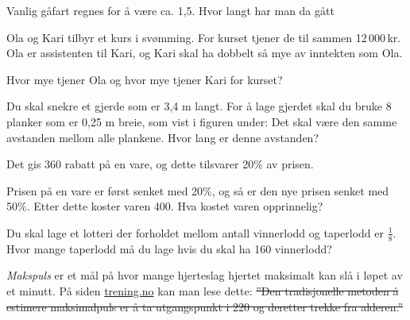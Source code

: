 



\opgt
\nes
{}
Vanlig gåfart regnes for å være ca. 1,5. Hvor langt har man da gått

Ola og Kari tilbyr et kurs i svømming. For kurset tjener de til sammen 12\,000\,kr. Ola er assistenten til Kari, og Kari skal ha dobbelt så mye av inntekten som Ola. \os

Hvor mye tjener Ola og hvor mye tjener Kari for kurset?

Du skal snekre et gjerde som er 3,4 m langt. For å lage gjerdet skal du bruke 8 planker som er 0,25 m breie, som vist i figuren under:
Det skal være den samme avstanden mellom alle plankene. Hvor lang er denne avstanden?

 \vs
{}

 \vs
{}

Det gis 360 rabatt på en vare, og dette tilsvarer 20\% av prisen.

Prisen på en vare er først senket med 20\%, og så er den nye prisen senket med 50\%. Etter dette koster varen 400. Hva kostet varen opprinnelig?

Du skal lage et lotteri der forholdet mellom antall vinnerlodd og taperlodd er $ \frac{1}{8} $. Hvor mange taperlodd må du lage hvis du skal ha 160 vinnerlodd?

\textit{Makspuls} er et mål på hvor mange hjerteslag hjertet maksimalt kan slå i løpet av et minutt. På siden \href{http://www.trening.no/utholdenhet/ny-formel-for-beregning-av-makspuls/}{\color{blue}trening.no} kan man lese dette:\os
\st{''Den tradisjonelle metoden å estimere maksimalpuls er å ta utgangspunkt i 220 og deretter trekke fra alderen.''}

